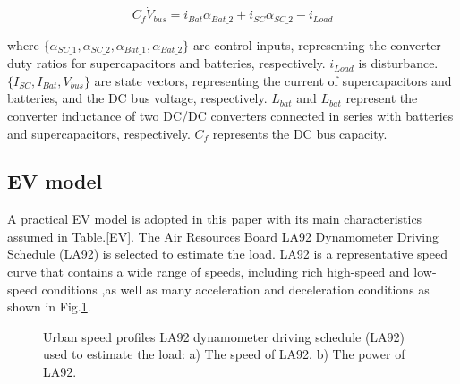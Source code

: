 \documentclass[energies,article,submit,moreauthors,pdftex,10pt,a4paper]{Definitions/mdpi}
\begin{document}
\begin{equation}
{{C_f}{{\dot V}_{bus}} = {i_{Bat}}{\alpha _{Bat\_2}} + {i_{SC}}{\alpha _{SC\_2}} - {i_{Load}}}
\end{equation}

where $\{ {\alpha _{SC\_1}}, {\alpha _{SC\_2}}, {\alpha _{Bat\_1}},{\alpha _{Bat\_2}}\} $ are control inputs, representing the converter duty ratios for supercapacitors and batteries, respectively. ${i_{Load}}$ is disturbance.
$\{ {I_{SC}}, {I_{Bat}}, {V_{bus}}\} $ are state vectors, representing the current of supercapacitors and batteries, and the DC bus voltage, respectively. $L_{bat}$ and $L_{bat}$ represent the converter inductance of two DC/DC converters connected in series with batteries and supercapacitors, respectively. $C_f$ represents the DC bus capacity. 

\subsection{EV model}
A practical EV model is adopted in this paper with its main characteristics assumed in Table.\ref{EV}.
The Air Resources Board LA92 Dynamometer Driving Schedule (LA92) is selected to estimate the load. LA92 is a representative speed curve that contains a wide range of speeds, including rich high-speed and low-speed conditions ,as well as many acceleration and deceleration conditions as shown in Fig.\ref{LA92}. 

\begin{figure}[ht]
\centering  %
\caption{Urban speed profiles LA92 dynamometer driving schedule (LA92) used to estimate the load: a) The speed of  LA92. b)  The power of  LA92.}
\label{LA92}
\end{figure}
\end{document}
